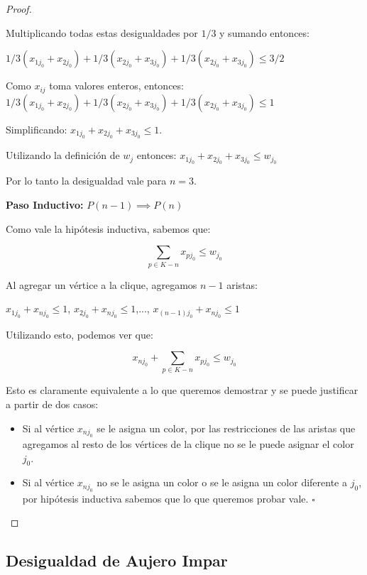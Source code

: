 \begin{proof}
\begin{enumerate}
Multiplicando todas estas desigualdades por $1/3$ y sumando entonces:

$1/3 (x_{1j_0} + x_{2j_0})  + 1/3 (x_{2j_0} + x_{3j_0}) + 1/3 (x_{2j_0} + x_{3j_0}) \leq 3/2$

Como $x_{ij}$ toma valores enteros, entonces:
$1/3 (x_{1j_0} + x_{2j_0})  + 1/3 (x_{2j_0} + x_{3j_0}) + 1/3 (x_{2j_0} + x_{3j_0}) \leq 1$

Simplificando: $x_{1j_0} + x_{2j_0} +  x_{3j_0} \leq 1$.

Utilizando la definición de $w_j$ entonces: $x_{1j_0} + x_{2j_0} +  x_{3j_0} \leq w_{j_0}$

Por lo tanto la desigualdad vale para $n=3$.

\end{enumerate}

\hfill

\textbf{Paso Inductivo:} $P(n-1) \implies P(n)$

Como vale la hipótesis inductiva, sabemos que:

\begin{equation*}
\sum_{p \in K-n} x_{pj_0} \leq w_{j_0}
\end{equation*}

Al agregar un vértice a la clique, agregamos $n-1$ aristas:

$x_{1j_0} + x_{nj_0} \leq 1$, $x_{2j_0} + x_{nj_0} \leq 1$,...,
$x_{(n-1)j_0} + x_{nj_0} \leq 1$

Utilizando esto, podemos ver que:

\begin{equation*}
x_{nj_0} + \sum_{p \in K-n} x_{pj_0} \leq w_{j_0}
\end{equation*}

Esto es claramente equivalente a lo que queremos demostrar y se puede justificar a partir de dos casos:

\begin{itemize}
\item Si al vértice $x_{nj_0}$ se le asigna un color, por las restricciones de las aristas que agregamos al resto de los vértices de la clique no se le puede asignar el color $j_0$.
\item Si al vértice $x_{nj_0}$ no se le asigna un color o se le asigna un color diferente a $j_0$, por hipótesis inductiva sabemos que lo que queremos probar vale. \hfill $\square$
\end{itemize}
\end{proof}

\subsection{Desigualdad de Aujero Impar}

